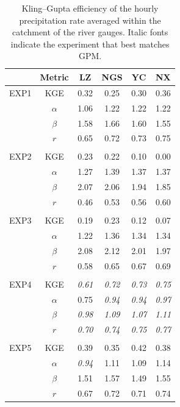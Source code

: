 \documentclass[draft]{agujournal2019}
\begin{document}
\begin{table}[h!]
  \centering
  \doublerulesep 0.3pt
  \renewcommand{\arraystretch}{1}  %
  \caption{Kling--Gupta efficiency of the hourly precipitation rate averaged within the catchment of the river gauges. Italic fonts indicate the experiment that best matches GPM.}
  \label{tab:pr_skill}
  \vspace*{5mm}
  \small
  \begin{tabular*}{80mm}{cccccc}
    \hline
    & Metric & LZ & NGS & YC & NX \\
    \hline
    EXP1 & KGE & 0.32 & 0.25 & 0.30 & 0.36 \\
    & $\alpha$ & 1.06 & 1.22 & 1.22 & 1.22 \\
    & $\beta$ & 1.58 & 1.66 & 1.60 & 1.55 \\
    & $r$ & 0.65 & 0.72 & 0.73 & 0.75 \\
    \\
    EXP2 & KGE & \textminus{}0.23 & \textminus{}0.22 & \textminus{}0.10 & 0.00 \\
    & $\alpha$ & 1.27 & 1.39 & 1.37 & 1.37 \\
    & $\beta$ & 2.07 & 2.06 & 1.94 & 1.85 \\
    & $r$ & 0.46 & 0.53 & 0.56 & 0.60 \\
    \\
    EXP3 & KGE & \textminus{}0.19 & \textminus{}0.23 & \textminus{}0.12 & \textminus{}0.07 \\
    & $\alpha$ & 1.22 & 1.36 & 1.34 & 1.34 \\
    & $\beta$ & 2.08 & 2.12 & 2.01 & 1.97 \\
    & $r$ & 0.58 & 0.65 & 0.67 & 0.69 \\
    \\
    EXP4 & KGE & \textit{0.61} & \textit{0.72} & \textit{0.73} & \textit{0.75} \\
    & $\alpha$ & 0.75 & \textit{0.94} & \textit{0.94} & \textit{0.97} \\
    & $\beta$ & \textit{0.98} & \textit{1.09} & \textit{1.07} & \textit{1.11} \\
    & $r$ & \textit{0.70} & \textit{0.74} & \textit{0.75} & \textit{0.77} \\
    \\
    EXP5 & KGE & 0.39 & 0.35 & 0.42 & 0.38 \\
    & $\alpha$ & \textit{0.94} & 1.11 & 1.09 & 1.14 \\
    & $\beta$ & 1.51 & 1.57 & 1.49 & 1.55 \\
    & $r$ & 0.67 & 0.72 & 0.71 & 0.74 \\
    \hline
  \end{tabular*}
  \renewcommand{\arraystretch}{1}  %
\end{table}
\end{document}
